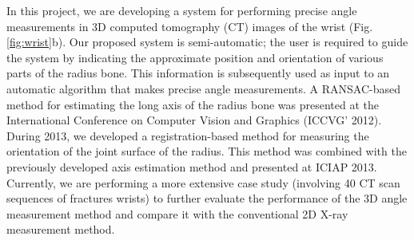 \documentclass[10pt, a4paper]{article}
\begin{document}
\begin{enumerate}
{In this project, we are developing a system for performing precise angle measurements in 3D computed tomography (CT) images of the wrist (Fig. \ref{fig:wrist}b). Our proposed system is semi-automatic; the user is required to guide the system by indicating the approximate position and orientation of various parts of the radius bone. This information is subsequently used as input to an automatic algorithm that makes precise angle measurements. A RANSAC-based method for estimating the long axis of the radius bone was presented at the International Conference on Computer Vision and Graphics (ICCVG' 2012). During 2013, we developed a registration-based method for measuring the orientation of the joint surface of the radius. This method was combined with the previously developed axis estimation method and presented at ICIAP 2013. Currently, we are performing a more extensive case study (involving 40 CT scan sequences of fractures wrists) to further evaluate the performance of the 3D angle measurement method and compare it with the conventional 2D X-ray measurement method.}


\end{enumerate}
\end{document}
